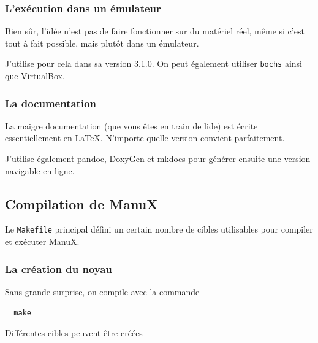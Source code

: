 \subsubsection{L'exécution dans un émulateur}

   Bien sûr, l'idée n'est pas de faire fonctionner \manux sur du
matériel réel, même si c'est tout à fait possible, mais plutôt dans un
émulateur.

   J'utilise pour cela \qemu dans sa version 3.1.0. On peut
également utiliser {\tt bochs} ainsi que VirtualBox.
   
%
\subsubsection{La documentation}

   La maigre documentation (que vous êtes  en train de lide) est
écrite essentiellement en LaTeX. N'importe quelle version convient
parfaitement.

   J'utilise également pandoc, DoxyGen et mkdocs pour générer ensuite une
version navigable en ligne.

%
\subsection{Compilation de ManuX}

   Le {\tt Makefile} principal défini un certain nombre de cibles
utilisables pour compiler et exécuter ManuX.
   
%
\subsubsection{La création du noyau}

   Sans grande surprise, on compile avec la commande

\begin{lstlisting}
  make
\end{lstlisting}

  Différentes cibles peuvent être créées

